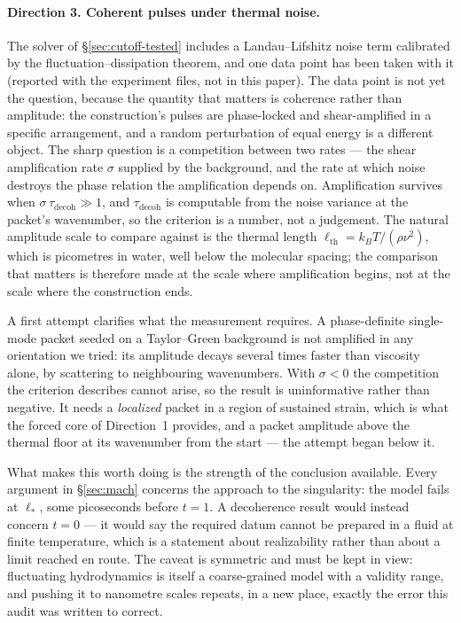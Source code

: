 \documentclass[11pt,a4paper]{article}
\begin{document}
\paragraph{Direction 3. Coherent pulses under thermal noise.}
The solver of \S\ref{sec:cutoff-tested} includes a Landau--Lifshitz noise term calibrated by the
fluctuation--dissipation theorem, and one data point has been taken with it (reported with the
experiment files, not in this paper).
The data point is not yet the question, because the quantity that matters is coherence rather than
amplitude: the construction's pulses are phase-locked and shear-amplified in a specific
arrangement, and a random perturbation of equal energy is a different object. The sharp question is
a competition between two rates --- the shear amplification rate $\sigma$ supplied by the
background, and the rate at which noise destroys the phase relation the amplification depends on.
Amplification survives when $\sigma\,\tau_{\text{decoh}}\gg1$, and $\tau_{\text{decoh}}$ is
computable from the noise variance at the packet's wavenumber, so the criterion is a number, not a
judgement. The natural amplitude scale to compare against is the thermal length
$\ell_{\text{th}}=k_BT/(\rho\nu^2)$, which is picometres in water, well below the molecular
spacing; the comparison that matters is therefore made at the scale where amplification begins,
not at the scale where the construction ends.

A first attempt clarifies what the measurement requires. A phase-definite single-mode packet seeded
on a Taylor--Green background is not amplified in any orientation we tried: its amplitude decays
several times faster than viscosity alone, by scattering to neighbouring wavenumbers. With
$\sigma<0$ the competition the criterion describes cannot arise, so the result is uninformative
rather than negative. It needs a \emph{localized} packet in a region of sustained strain, which is
what the forced core of Direction~1 provides, and a packet amplitude above the thermal floor at its
wavenumber from the start --- the attempt began below it.

What makes this worth doing is the strength of the conclusion available. Every argument in
\S\ref{sec:mach} concerns the approach to the singularity: the model fails at $\ell_*$, some
picoseconds before $t=1$. A decoherence result would instead concern $t=0$ --- it would say the
required datum cannot be prepared in a fluid at finite temperature, which is a statement about
realizability rather than about a limit reached en route. The caveat is symmetric and must be kept
in view: fluctuating hydrodynamics is itself a coarse-grained model with a validity range, and
pushing it to nanometre scales repeats, in a new place, exactly the error this audit was written to
correct.
\end{document}
